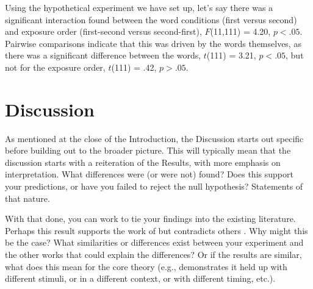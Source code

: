 \documentclass[stu,12pt,floatsintext,a4paper]{apa7}
\begin{document}
\newcommand{\ttestSig}[2]{$t$(#1) = #2, $p < .05$}
\newcommand{\ttestInsig}[2]{$t$(#1) = #2, $p > .05$}
\newcommand{\anovaSig}[3]{$F$(#1,#2) = #3, $p < .05$}
\newcommand{\anovaInsig}[3]{$F$(#1,#2) = #3, $p > .05$}

Using the hypothetical experiment we have set up, let's say there was a significant interaction found between the word conditions (first versus second) and exposure order (first-second versus second-first), \anovaSig{11}{111}{4.20}. Pairwise comparisons indicate that this was driven by the words themselves, as there was a significant difference between the words, \ttestSig{111}{3.21}, but not for the exposure order, \ttestInsig{111}{.42}.

\section{Discussion}

As mentioned at the close of the Introduction, the Discussion starts out specific before building out to the broader picture. This will typically mean that the discussion starts with a reiteration of the Results, with more emphasis on interpretation. What differences were (or were not) found? Does this support your predictions, or have you failed to reject the null hypothesis? Statements of that nature.

With that done, you can work to tie your findings into the existing literature. Perhaps this result supports the work of \textcite{Contributor2023} but contradicts others \parencite[e.g.,][]{Sample2024}. %
Why might this be the case? What similarities or differences exist between your experiment and the other works that could explain the differences? Or if the results are similar, what does this mean for the core theory (e.g., demonstrates it held up with different stimuli, or in a different context, or with different timing, etc.).
\end{document}
